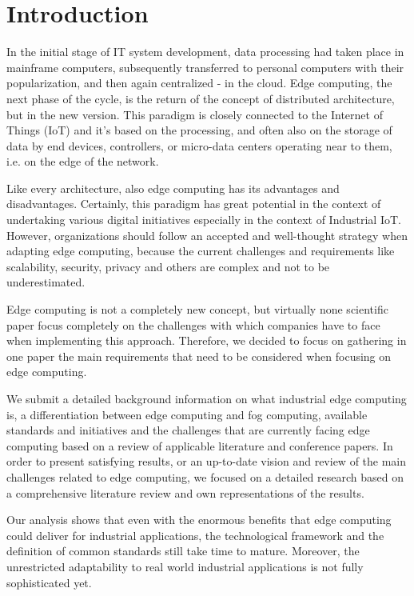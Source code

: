 \section{Introduction}\label{sec:introduction}
In the initial stage of IT system development, data processing had taken place in mainframe computers, subsequently transferred to personal computers with their popularization, and then again centralized - in the cloud. Edge computing, the next phase of the cycle, is the return of the concept of distributed architecture, but in the new version. This paradigm is closely connected to the Internet of Things (IoT) and it's based on the processing, and often also on the storage of data by end devices, controllers, or micro-data centers operating near to them, i.e. on the edge of the network.\par 
Like every architecture, also edge computing has its advantages and disadvantages. Certainly, this paradigm has great potential in the context of undertaking various digital initiatives especially in the context of Industrial IoT. However, organizations should follow an accepted and well-thought strategy when adapting edge computing, because the current challenges and requirements like scalability, security, privacy and others are complex and not to be underestimated.\par
Edge computing is not a completely new concept, but virtually none scientific paper focus completely on the challenges with which companies have to face when implementing this approach. Therefore, we decided to focus on gathering in one paper the main requirements that need to be considered when focusing on edge computing. \par
We submit a detailed background information on what industrial edge computing is, a differentiation between edge computing and fog computing, available standards and initiatives and the challenges that are currently facing edge computing based on a review of applicable literature and conference papers. In order to present satisfying results, or an up-to-date vision and review of the main challenges related to edge computing, we focused on a detailed research based on a comprehensive literature review and own representations of the results. \par
Our analysis shows that even with the enormous benefits that edge computing could deliver for industrial applications, the technological framework and the definition of common standards still take time to mature. Moreover, the unrestricted adaptability to real world industrial applications is not fully sophisticated yet.\par 
